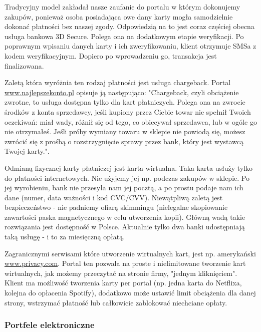 \documentclass[12pt]{article}
\numberwithin{figure}{section}
\begin{document}
\begin{sloppypar}
Tradycyjny model zakładał nasze zaufanie do portalu w którym dokonujemy zakupów, ponieważ osoba posiadająca owe dany karty mogła samodzielnie dokonać płatności bez naszej zgody. Odpowiedzią na to jest coraz częściej obecna usługa bankowa 3D Secure. Polega ona na dodatkowym etapie weryfikacji. Po poprawnym wpisaniu danych karty i ich zweryfikowaniu, klient otrzymuje SMSa z kodem weryfikacyjnym. Dopiero po wprowadzeniu go, transakcja jest finalizowana.

Zaletą która wyróżnia ten rodzaj płatności jest usługa chargeback. Portal \url{www.najlepszekonto.pl} opisuje ją następująco: "Chargeback, czyli obciążenie zwrotne, to usługa dostępna tylko dla kart płatniczych. Polega ona na zwrocie środków z konta sprzedawcy, jeśli kupiony przez Ciebie towar nie spełnił Twoich oczekiwań: miał wady, różnił się od tego, co obiecywał sprzedawca, lub w ogóle go nie otrzymałeś. Jeśli próby wymiany towaru w sklepie nie powiodą się, możesz zwrócić się z prośbą o rozstrzygnięcie sprawy przez bank, który jest wystawcą Twojej karty."\cite{chargeback}.

Odmianą fizycznej karty płatniczej jest karta wirtualna. Taka karta usłuży tylko do płatności internetowych. Nie użyjemy jej np. podczas zakupów w sklepie. Po jej wyrobieniu, bank nie przesyła nam jej pocztą, a po prostu podaje nam ich dane (numer, data ważności i kod CVC/CVV). Niewątpliwą zaletą jest bezpieczeństwo - nie padniemy ofiarą skimmingu (nielegalne skopiowanie zawartości paska magnetycznego w celu utworzenia kopii). Główną wadą takie rozwiązania jest dostępność w Polsce. Aktualnie tylko dwa banki udostępniają taką usługę - i to za miesięczną opłatą. 

Zagranicznymi serwisami które utworzenie wirtualnych kart, jest np. amerykański \url{www.privacy.com}. Portal ten pozwala na proste i nielimitowane tworzenie kart wirtualnych, jak możemy przeczytać na stronie firmy, "jednym kliknięciem". Klient ma możliwość tworzenia karty per portal (np. jedna karta do Netflixa, kolejna do opłacenia Spotify), dodatkowo może ustawić limit obciążenia dla danej strony, wstrzymać płatność lub całkowicie zablokować niechciane opłaty. 

\subsubsection{Portfele elektroniczne}


\end{sloppypar}
\end{document}
